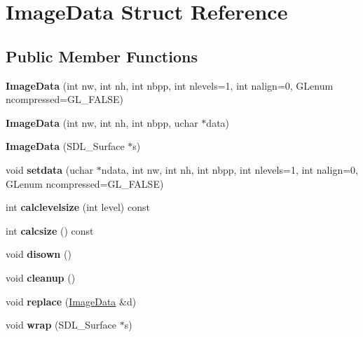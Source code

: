 \hypertarget{struct_image_data}{}\section{Image\+Data Struct Reference}
\label{struct_image_data}
\subsection*{Public Member Functions}
\begin{DoxyCompactItemize}
\item 
\mbox{\label{struct_image_data_a27a81ca3395aa53aeee3628a5bbb73bf}} 
{\bfseries Image\+Data} (int nw, int nh, int nbpp, int nlevels=1, int nalign=0, G\+Lenum ncompressed=G\+L\+\_\+\+F\+A\+L\+SE)
\item 
\mbox{\label{struct_image_data_ab30a5e4f9839faecceb2b026d7d37edf}} 
{\bfseries Image\+Data} (int nw, int nh, int nbpp, uchar $\ast$data)
\item 
\mbox{\label{struct_image_data_a77e53767fe36d4f4e72d835529b8b2fb}} 
{\bfseries Image\+Data} (S\+D\+L\+\_\+\+Surface $\ast$s)
\item 
\mbox{\label{struct_image_data_a087fbda44d0ae206d9c7d237e4ea09a3}} 
void {\bfseries setdata} (uchar $\ast$ndata, int nw, int nh, int nbpp, int nlevels=1, int nalign=0, G\+Lenum ncompressed=G\+L\+\_\+\+F\+A\+L\+SE)
\item 
\mbox{\label{struct_image_data_a14590ad377a02b7784c9586f803c1ff2}} 
int {\bfseries calclevelsize} (int level) const
\item 
\mbox{\label{struct_image_data_afe3ac787b0bbd7d0a6e06d79f09fde2e}} 
int {\bfseries calcsize} () const
\item 
\mbox{\label{struct_image_data_a3c2e4ae2c52ed932c2c09fe21ef63924}} 
void {\bfseries disown} ()
\item 
\mbox{\label{struct_image_data_a2caebc9cb33554c5a17bedcf65eb3f70}} 
void {\bfseries cleanup} ()
\item 
\mbox{\label{struct_image_data_a72468c5642580929203d001d83f2bc5d}} 
void {\bfseries replace} (\hyperlink{struct_image_data}{Image\+Data} \&d)
\item 
\mbox{\label{struct_image_data_ad4a0d4eccc93077ff261692116d08de7}} 
void {\bfseries wrap} (S\+D\+L\+\_\+\+Surface $\ast$s)
\end{DoxyCompactItemize}
